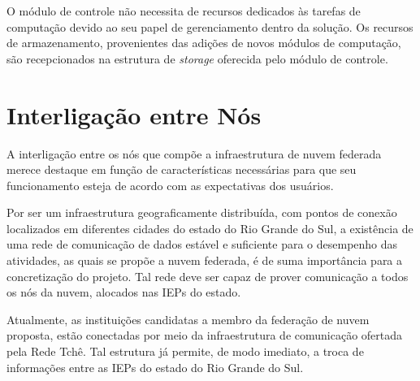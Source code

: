 \documentclass[tese,capa]{texufpel}
\begin{document}
O módulo de controle não necessita de recursos dedicados às tarefas de computação devido ao seu papel de gerenciamento dentro da solução. Os recursos de armazenamento, provenientes das adições de novos módulos de computação, são recepcionados na estrutura de \emph{storage} oferecida pelo módulo de controle.




\section{Interligação entre Nós}\label{sec:rede}

A interligação entre os nós que compõe a infraestrutura de nuvem federada merece destaque em função de características  necessárias para que seu funcionamento esteja de acordo com as expectativas dos usuários.

Por ser um infraestrutura geograficamente distribuída, com pontos de conexão localizados em diferentes cidades do estado do Rio Grande do Sul, a existência de uma rede de comunicação de dados estável e suficiente para o desempenho das atividades, as quais se propõe a nuvem federada, é de suma importância para a concretização do projeto. Tal rede deve ser capaz de prover comunicação a todos os nós da nuvem, alocados nas IEPs do estado.

Atualmente, as instituições candidatas a membro da federação de nuvem proposta, estão conectadas por meio da infraestrutura de comunicação ofertada pela Rede Tchê. Tal estrutura já permite, de modo imediato, a troca de informações entre as IEPs do estado do Rio Grande do Sul.
\end{document}
